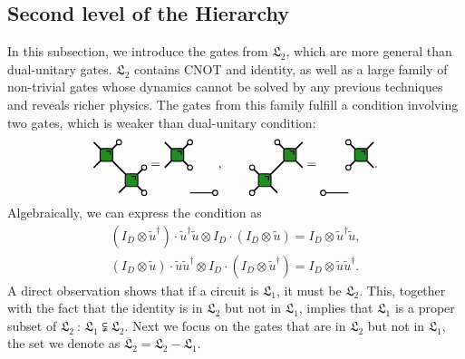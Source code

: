 \documentclass[aps,prx,twocolumn,notitlepage,nofootinbib,nobalancelastpage]{revtex4-2}
\theoremstyle{break}
\newcommand{\1}{\mathbbm{1}}
\theoremstyle{plain}
\theoremstyle{plain}
\theoremstyle{plain}
\newcommand{\Wgategreen}[2]{
\draw[very thick] (#1-0.5, #2 +0.5) -- (#1+0.5,#2-0.5);
\draw[very thick] (#1-0.5,#2-0.5) -- (#1+0.5,#2+0.5);
\draw[ thick, fill=mygreen, rounded corners=2pt] (#1-0.25,#2+0.25) rectangle (#1+0.25,#2-0.25);
\draw[thick] (#1,#2+0.15) -- (#1+0.15,#2+0.15) -- (#1+0.15,#2);
}
\newcommand{\MYcircle}[2]{
\draw[thick, fill=white] (#1,#2) circle (0.1cm); }
\begin{document}
\subsection{Second level of the Hierarchy\label{subsec:Second-Hierarchy}}

In this subsection, we introduce the gates from $\mathfrak{L}_2$, which are more general than dual-unitary gates. $\mathfrak{L}_2$ contains CNOT and identity, as well as a large family of non-trivial gates whose dynamics cannot be solved by any previous techniques and reveals richer physics. The gates from this family fulfill a condition involving two gates, which is weaker than dual-unitary condition:
\begin{equation}
\begin{tikzpicture}[baseline=(current  bounding  box.center), scale=0.7]
\Wgategreen{-0.5}{0.5}
\Wgategreen{0.5}{-0.5}
\MYcircle{0}{1}
\MYcircle{1}{0}
\MYcircle{1}{-1}
\end{tikzpicture}
=
\begin{tikzpicture}[baseline=(current  bounding  box.center), scale=0.7]
\draw[thick] (0,-1)--(1,-1);
\Wgategreen{-0.5}{0.5}
\MYcircle{0}{1}
\MYcircle{0}{00}
\MYcircle{1}{-1}
\end{tikzpicture}
,
\qquad
\begin{tikzpicture}[baseline=(current  bounding  box.center), scale=0.7]
\Wgategreen{0.5}{0.5}
\Wgategreen{-0.5}{-0.5}
\MYcircle{0}{1}
\MYcircle{-1}{0}
\MYcircle{-1}{-1}
\end{tikzpicture}
=
\begin{tikzpicture}[baseline=(current  bounding  box.center), scale=0.7]
\draw[thick] (0,-1)--(-1,-1);
\Wgategreen{0.5}{0.5}
\MYcircle{0}{1}
\MYcircle{0}{0}
\MYcircle{-1}{-1}
\end{tikzpicture}
.\label{eq2:bottomtotop}
\end{equation}
Algebraically, we can express the condition as 
\begin{equation}
\begin{aligned}(I_{D}\otimes\tilde{u}^{\dagger})\cdot\tilde{u}^{\dagger}\tilde{u}\otimes I_{D}\cdot(I_{D}\otimes\tilde{u})=I_{D}\otimes\tilde{u}^{\dagger}\tilde{u},\\
(I_{D}\otimes\tilde{u})\cdot\tilde{u}\tilde{u}^{\dagger}\otimes I_{D}\cdot(I_{D}\otimes\tilde{u}^{\dagger})=I_{D}\otimes\tilde{u}\tilde{u}^{\dagger}.
\end{aligned}
\label{eq:2ndEq}
\end{equation}
A direct observation shows that if a circuit is $\mathfrak{L}_1$, it must be $\mathfrak{L}_2$. This, together with the fact that the identity is in $\mathfrak{L}_2$ but not in $\mathfrak{L}_1$, implies that $\mathfrak{L}_1$ is a proper subset of $\mathfrak{L}_2 \ $:
$\mathfrak{L}_1\subsetneqq\mathfrak{L}_2$. Next we focus on the gates that are in $\mathfrak{L}_2$ but not in $\mathfrak{L}_1$, the set we denote as $\overline{\mathfrak{L}}_2=\mathfrak{L}_2-\mathfrak{L}_1$.
\end{document}

